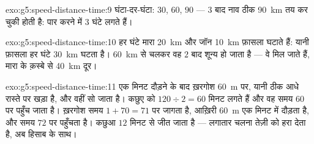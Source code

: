\begin{solution}{exo:g5:speed-distance-time:9}
घंटा-दर-घंटा: $30$, $60$, $90$ --- $3$  बाद नाव ठीक
\qty{90}{km} तय कर चुकी होती है: पार करने में $3$ घंटे लगते हैं।
\end{solution}

\begin{solution}{exo:g5:speed-distance-time:10}
हर घंटे मारा \qty{20}{km} और जॉन \qty{10}{km} फ़ासला घटाते हैं: यानी
फ़ासला हर घंटे \qty{30}{km} घटता है। \qty{60}{km} से चलकर वह $2$
 बाद शून्य हो जाता है --- वे मिल जाते हैं, मारा के क़स्बे से
\qty{40}{km} दूर।
\end{solution}

\begin{solution}{exo:g5:speed-distance-time:11}
एक मिनट दौड़ने के बाद ख़रगोश \qty{60}{m} पर, यानी ठीक आधे रास्ते पर
खड़ा है, और वहीं सो जाता है। कछुए को $120 \div 2 = 60$ मिनट लगते हैं
और वह समय $60$ पर पहुँच जाता है। ख़रगोश समय $1 + 70 = 71$ पर जागता
है, आख़िरी \qty{60}{m} एक मिनट में दौड़ता है, और समय $72$ पर पहुँचता
है। कछुआ $12$ मिनट से जीत जाता है --- लगातार चलना तेज़ी को हरा देता
है, अब हिसाब के साथ।
\end{solution}
